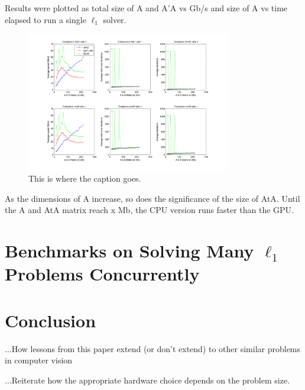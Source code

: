 \documentclass[10pt,twocolumn,letterpaper]{article}
\begin{document}
Results were plotted as total size of A and A'A vs Gb/s and size of A vs time
elapsed to run a single $\ell_1$ solver.

\begin{figure}
\centering
\includegraphics[width=3.5in]{figures/PALM_benchmark_ratio_1.png}
\caption{This is where the caption goes.}
\label{fig:uniqueidentifierforthisimage}
\end{figure}


As the dimensions of A increase, so does the significance of the size of AtA.  Until the A and AtA matrix reach x Mb, the CPU version runs faster than the GPU.  

\section{Benchmarks on Solving Many $\ell_1$ Problems Concurrently}





\section{Conclusion}
...How lessons from this paper extend (or don't extend) to other similar problems in computer vision

...Reiterate how the appropriate hardware choice depends on the problem size.



{\small


}
\end{document}
